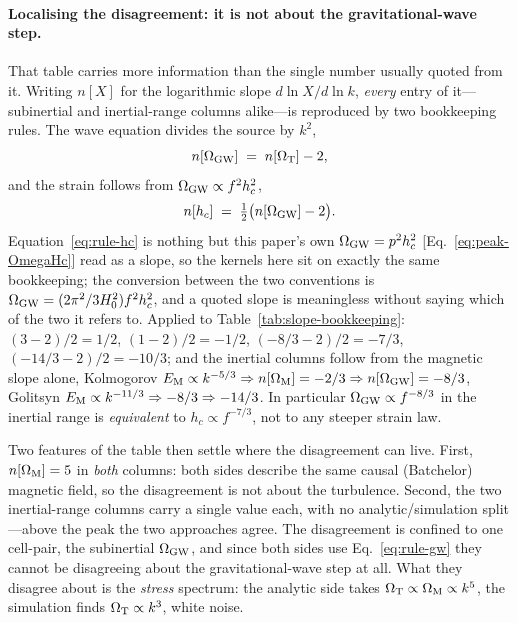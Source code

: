 \documentclass[10pt,prd,aps,nobibnotes,superscriptaddress,preprintnumbers,notitlepage]{revtex4-1}
\begin{document}
\paragraph{Localising the disagreement: it is not about the gravitational-wave step.}
That table carries more information than the single number usually quoted from it. Writing
$n[X]$ for the logarithmic slope $d\ln X/d\ln k$, \emph{every} entry of it---subinertial and
inertial-range columns alike---is reproduced by two bookkeeping rules. The wave equation
divides the source by $k^2$,
\begin{equation}
  n[\Omega_{\rm GW}] \;=\; n[\Omega_{\rm T}]-2,
  \label{eq:rule-gw}
\end{equation}
and the strain follows from $\Omega_{\rm GW}\propto f^2h_c^2$,
\begin{equation}
  n[h_c] \;=\; \tfrac12\bigl(n[\Omega_{\rm GW}]-2\bigr).
  \label{eq:rule-hc}
\end{equation}
Equation~\eqref{eq:rule-hc} is nothing but this paper's own
$\Omega_{\rm GW}=p^2h_c^2$ [Eq.~\eqref{eq:peak-OmegaHc}] read as a slope, so the kernels
here sit on exactly the same bookkeeping; the conversion between the two conventions is
$\Omega_{\rm GW}=(2\pi^2/3H_0^2)f^2h_c^2$, and a quoted slope is meaningless without saying
which of the two it refers to. Applied to Table~\ref{tab:slope-bookkeeping}: $(3-2)/2=1/2$,
$(1-2)/2=-1/2$, $(-8/3-2)/2=-7/3$, $(-14/3-2)/2=-10/3$; and the inertial columns follow from
the magnetic slope alone, Kolmogorov $E_{\rm M}\propto k^{-5/3}\Rightarrow
n[\Omega_{\rm M}]=-2/3\Rightarrow n[\Omega_{\rm GW}]=-8/3$, Golitsyn
$E_{\rm M}\propto k^{-11/3}\Rightarrow-8/3\Rightarrow-14/3$. In particular
$\Omega_{\rm GW}\propto f^{-8/3}$ in the inertial range is \emph{equivalent} to
$h_c\propto f^{-7/3}$, not to any steeper strain law.

Two features of the table then settle where the disagreement can live. First,
$n[\Omega_{\rm M}]=5$ in \emph{both} columns: both sides describe the same causal
(Batchelor) magnetic field, so the disagreement is not about the turbulence. Second, the two
inertial-range columns carry a single value each, with no analytic/simulation split---above
the peak the two approaches agree. The disagreement is confined to one cell-pair, the
subinertial $\Omega_{\rm GW}$, and since both sides use Eq.~\eqref{eq:rule-gw} they cannot be
disagreeing about the gravitational-wave step at all. What they disagree about is the
\emph{stress} spectrum: the analytic side takes
$\Omega_{\rm T}\propto\Omega_{\rm M}\propto k^5$, the simulation finds
$\Omega_{\rm T}\propto k^3$, white noise.
\end{document}
